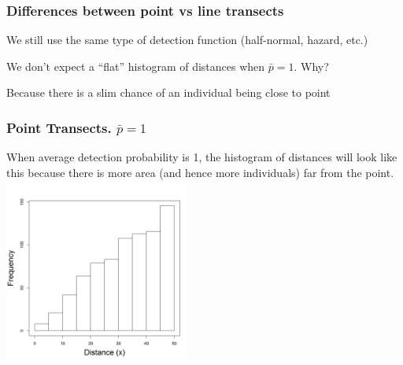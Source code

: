 \documentclass[color=usenames,dvipsnames]{beamer}\usepackage[]{graphicx}\usepackage[]{color}
\begin{document}
\begin{frame}
  \frametitle{Differences between point vs line transects}
  \large
  {We still use the same type of detection function (half-normal,
    hazard, etc.) \par}
  \pause
  \vfill %
  {We don't expect a ``flat'' histogram of distances when
    $\bar{p}=1$. Why? \par}
  \pause
  \vfill %
  {Because there is a slim chance of an individual being
    close to point} \par
\end{frame}










\begin{frame}
  \frametitle{Point Transects. $\bar{p}=1$}
  \centering
  When average detection probability is 1, the histogram of distances
  will look like this because there is more area (and hence more
  individuals) far from the point. \\
  \includegraphics[width=6cm]{figs/detfun5} \\
\end{frame}
\end{document}
